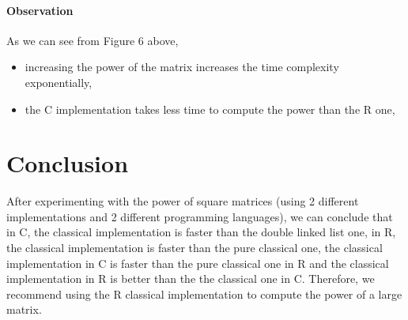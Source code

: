 \documentclass[12pt]{article}
\begin{document}
			
			\paragraph{Observation}
			As we can see from Figure 6 above, 
			\begin{itemize}
				\item increasing the power of the matrix increases the time complexity exponentially,
				\item the C implementation takes less time to compute the power than the R one,
			\end{itemize}
	\section{Conclusion}
	
		After experimenting with the power of square matrices (using 2 different implementations and 2 different programming languages), we can conclude that in C, the classical implementation is faster than the double linked list one, in R, the classical implementation is faster than the pure classical one, the classical implementation in C is faster than the pure classical one in R and the classical implementation in R is better than the the classical one in C. Therefore, we recommend using the R classical implementation to compute the power of a large matrix.	
\end{document}
